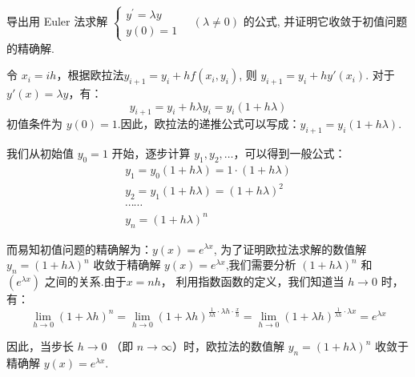    \begin{tcolorbox}[breakable,enhanced,arc=0mm,outer arc=0mm,
		boxrule=0pt,toprule=1pt,leftrule=0pt,bottomrule=1pt, rightrule=0pt,left=0.2cm,right=0.2cm,
		titlerule=0.5em,toptitle=0.1cm,bottomtitle=-0.1cm,top=0.2cm,
		colframe=white!10!biru,colback=white!90!biru,coltitle=white,
            coltext=black,title =2024-04, title style={white!10!biru}, before skip=8pt, after skip=8pt,before upper=\hspace{2em},
		fonttitle=\bfseries,fontupper=\normalsize]
导出用 Euler 法求解 $ \left\{\begin{array}{l}y^{\prime}=\lambda y \\ y(0)=1\end{array} \quad(\lambda \neq 0)\right. $ 的公式, 并证明它收敛于初值问题的精确解.
\tcblower

令 $ x_i = i h $，根据欧拉法$ y_{i+1} = y_i + h f(x_i,y_i)$, 则 $ y_{i+1} = y_i + h y'(x_i) $. 对于 $ y'(x) = \lambda y $，有：
$$
y_{i+1} = y_i + h \lambda y_i = y_i (1 + h \lambda)
$$
初值条件为 $ y(0) = 1 $.因此，欧拉法的递推公式可以写成：$y_{i+1} = y_i (1 + h \lambda)$.

我们从初始值 $ y_0 = 1 $ 开始，逐步计算 $ y_1, y_2, \ldots $，可以得到一般公式：
$$
\begin{array}{l}
       y_1 = y_0 (1 + h \lambda) = 1 \cdot (1 + h \lambda)\\
      y_2 = y_1 (1 + h \lambda) = (1 + h \lambda)^2\\
      \cdots\cdots\\
      y_n = (1 + h \lambda)^n
\end{array}
$$

而易知初值问题的精确解为：$y(x) = e^{\lambda x}$, 
为了证明欧拉法求解的数值解 $ y_n = (1 + h \lambda)^n $ 收敛于精确解 $y(x) = e^{\lambda x}$,我们需要分析 $ (1 + h \lambda)^n $ 和 $ \left(e^{\lambda x}\right)$ 之间的关系.由于$ x = nh $，
利用指数函数的定义，我们知道当 $ h \to 0 $ 时，有：
$$
\lim_{h\to 0}\left(1 + \lambda h \right)^n =\lim_{h\to 0}\left(1 + \lambda h \right)^{\frac{1}{\lambda h}\cdot \lambda h\cdot \frac{x}{h}}= \lim_{h\to 0}\left(1 + \lambda h \right)^{\frac{1}{\lambda h}\cdot \lambda x}= e^{\lambda x} 
$$

因此，当步长 $ h \to 0 $ （即 $ n \to \infty $）时，欧拉法的数值解 $ y_n = (1 + h \lambda)^n $ 收敛于精确解 $ y(x) = e^{\lambda x} $.


  \end{tcolorbox}

